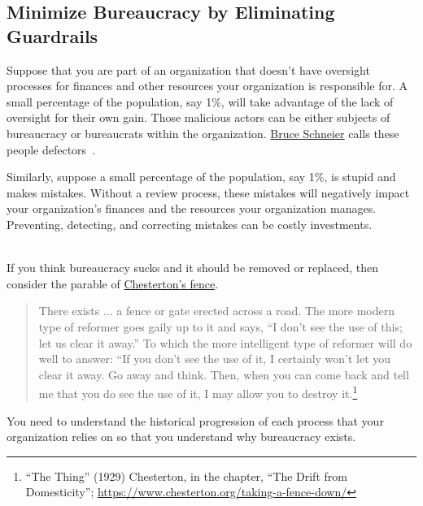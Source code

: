 \subsection*{Minimize Bureaucracy by Eliminating Guardrails}

Suppose that you are part of an organization that doesn't have oversight processes for finances and other resources your organization is responsible for. A small percentage of the population, say 1\%, will take advantage of the lack of oversight for their own gain. Those malicious actors can be either subjects of bureaucracy or bureaucrats within the organization. 
\href{https://en.wikipedia.org/wiki/Bruce_Schneier}{Bruce Schneier}
calls these people defectors~\cite{2012_Schneier}.

Similarly, suppose a small percentage of the population, say 1\%, is stupid and makes mistakes. Without a review process, these mistakes will negatively impact your organization's finances and the resources your organization manages. Preventing, detecting, and correcting mistakes can be costly investments. 

\ \\

If you think bureaucracy sucks and it should be removed or replaced, then consider the parable of \href{https://en.wikipedia.org/wiki/G._K._Chesterton#Chesterton's_fence}{Chesterton's fence}. 
\begin{quote}
There exists ... a fence or gate erected across a road. The more modern type of reformer goes gaily up to it and says, “I don’t see the use of this; let us clear it away.” To which the more intelligent type of reformer will do well to answer: “If you don’t see the use of it, I certainly won’t let you clear it away. Go away and think. Then, when you can come back and tell me that you do see the use of it, I may allow you to destroy it.\footnote{``The Thing'' (1929) Chesterton, in the chapter, ``The Drift from Domesticity''; \href{https://www.chesterton.org/taking-a-fence-down/}{https://www.chesterton.org/taking-a-fence-down/}}
\end{quote}
You need to understand the historical progression of each process that your organization relies on so that you understand why bureaucracy exists.

